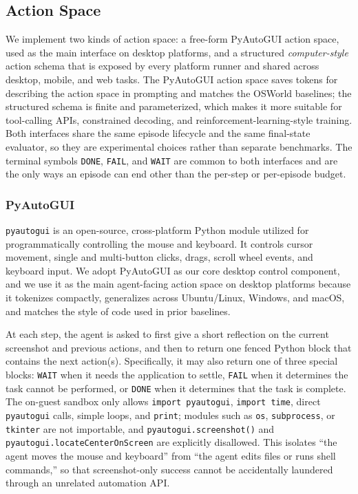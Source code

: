  

\subsection{Action Space}
\label{app:osomni_action}

We implement two kinds of action space: a free-form PyAutoGUI action space, used as the main interface on desktop platforms, and a structured \emph{computer-style} action schema that is exposed by every platform runner and shared across desktop, mobile, and web tasks. The PyAutoGUI action space saves tokens for describing the action space in prompting and matches the OSWorld baselines; the structured schema is finite and parameterized, which makes it more suitable for tool-calling APIs, constrained decoding, and reinforcement-learning-style training. Both interfaces share the same episode lifecycle and the same final-state evaluator, so they are experimental choices rather than separate benchmarks. The terminal symbols \texttt{DONE}, \texttt{FAIL}, and \texttt{WAIT} are common to both interfaces and are the only ways an episode can end other than the per-step or per-episode budget.


\subsubsection{PyAutoGUI}
\label{app:osomni_pyautogui}

\texttt{pyautogui} is an open-source, cross-platform Python module utilized for programmatically controlling the mouse and keyboard. It controls cursor movement, single and multi-button clicks, drags, scroll wheel events, and keyboard input. We adopt PyAutoGUI as our core desktop control component, and we use it as the main agent-facing action space on desktop platforms because it tokenizes compactly, generalizes across Ubuntu/Linux, Windows, and macOS, and matches the style of code used in prior baselines.

At each step, the agent is asked to first give a short reflection on the current screenshot and previous actions, and then to return one fenced Python block that contains the next action(s). Specifically, it may also return one of three special blocks: \texttt{WAIT} when it needs the application to settle, \texttt{FAIL} when it determines the task cannot be performed, or \texttt{DONE} when it determines that the task is complete. The on-guest sandbox only allows \texttt{import pyautogui}, \texttt{import time}, direct \texttt{pyautogui} calls, simple loops, and \texttt{print}; modules such as \texttt{os}, \texttt{subprocess}, or \texttt{tkinter} are not importable, and \texttt{pyautogui.screenshot()} and \texttt{pyautogui.locateCenterOnScreen} are explicitly disallowed. This isolates ``the agent moves the mouse and keyboard'' from ``the agent edits files or runs shell commands,'' so that screenshot-only success cannot be accidentally laundered through an unrelated automation
API.

